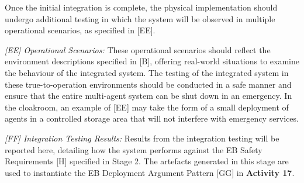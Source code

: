 \documentclass[runningheads]{llncs}
\begin{document}
Once the initial integration is complete, the physical implementation should undergo additional testing in which the system will be observed in multiple operational scenarios, as specified in [EE].

\emph{[EE] Operational Scenarios:} These operational scenarios should reflect the environment descriptions specified in [B], offering real-world situations to examine the behaviour of the integrated system. 
The testing of the integrated system in these true-to-operation environments should be conducted in a safe manner and ensure that the entire multi-agent system can be shut down in an emergency. 
In the cloakroom, an example of [EE] may take the form of a small deployment of agents in a controlled storage area that will not interfere with emergency services.
%

\emph{[FF] Integration Testing Results:} Results from the integration testing will be reported here, detailing how the system performs against the EB Safety Requirements [H] specified in Stage 2. 
The artefacts generated in this stage are used to instantiate the EB Deployment Argument Pattern [GG] in \textbf{Activity 17}.
\end{document}
